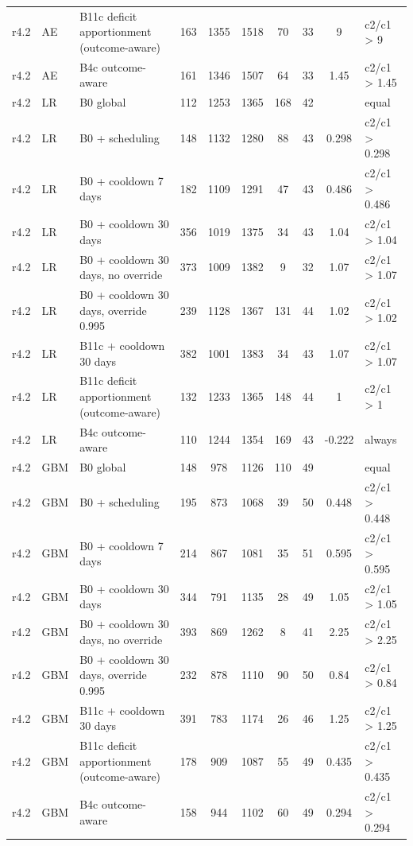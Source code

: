 \begin{longtable}{llp{4.6cm}ccccccl}
r4.2 & AE & B11c deficit apportionment (outcome-aware) & 163 & 1355 & 1518 & 70 & 33 & 9 & c2/c1 > 9 \\
r4.2 & AE & B4c outcome-aware & 161 & 1346 & 1507 & 64 & 33 & 1.45 & c2/c1 > 1.45 \\
r4.2 & LR & B0 global & 112 & 1253 & 1365 & 168 & 42 &  & equal \\
r4.2 & LR & B0 + scheduling & 148 & 1132 & 1280 & 88 & 43 & 0.298 & c2/c1 > 0.298 \\
r4.2 & LR & B0 + cooldown 7 days & 182 & 1109 & 1291 & 47 & 43 & 0.486 & c2/c1 > 0.486 \\
r4.2 & LR & B0 + cooldown 30 days & 356 & 1019 & 1375 & 34 & 43 & 1.04 & c2/c1 > 1.04 \\
r4.2 & LR & B0 + cooldown 30 days, no override & 373 & 1009 & 1382 & 9 & 32 & 1.07 & c2/c1 > 1.07 \\
r4.2 & LR & B0 + cooldown 30 days, override 0.995 & 239 & 1128 & 1367 & 131 & 44 & 1.02 & c2/c1 > 1.02 \\
r4.2 & LR & B11c + cooldown 30 days & 382 & 1001 & 1383 & 34 & 43 & 1.07 & c2/c1 > 1.07 \\
r4.2 & LR & B11c deficit apportionment (outcome-aware) & 132 & 1233 & 1365 & 148 & 44 & 1 & c2/c1 > 1 \\
r4.2 & LR & B4c outcome-aware & 110 & 1244 & 1354 & 169 & 43 & -0.222 & always \\
r4.2 & GBM & B0 global & 148 & 978 & 1126 & 110 & 49 &  & equal \\
r4.2 & GBM & B0 + scheduling & 195 & 873 & 1068 & 39 & 50 & 0.448 & c2/c1 > 0.448 \\
r4.2 & GBM & B0 + cooldown 7 days & 214 & 867 & 1081 & 35 & 51 & 0.595 & c2/c1 > 0.595 \\
r4.2 & GBM & B0 + cooldown 30 days & 344 & 791 & 1135 & 28 & 49 & 1.05 & c2/c1 > 1.05 \\
r4.2 & GBM & B0 + cooldown 30 days, no override & 393 & 869 & 1262 & 8 & 41 & 2.25 & c2/c1 > 2.25 \\
r4.2 & GBM & B0 + cooldown 30 days, override 0.995 & 232 & 878 & 1110 & 90 & 50 & 0.84 & c2/c1 > 0.84 \\
r4.2 & GBM & B11c + cooldown 30 days & 391 & 783 & 1174 & 26 & 46 & 1.25 & c2/c1 > 1.25 \\
r4.2 & GBM & B11c deficit apportionment (outcome-aware) & 178 & 909 & 1087 & 55 & 49 & 0.435 & c2/c1 > 0.435 \\
r4.2 & GBM & B4c outcome-aware & 158 & 944 & 1102 & 60 & 49 & 0.294 & c2/c1 > 0.294 \\

\end{longtable}
